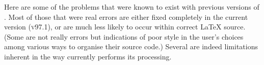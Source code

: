 \internal{}%
\startdocument
%
\tableofchildlinks*\htmlrule{}\html{\\}%
\noindent
Here are some of the problems that were known to exist
with previous versions of \latextohtml.
Most of those that were real errors are either fixed completely
in the current version (\textsc{v97.1}), or are much less likely to occur
within correct \LaTeX{} source. (Some are not really errors but
indications of poor style in the user's choices among
various ways to organise their source code.)\html{\\}
Several are indeed limitations inherent in the way
\latextohtml{} currently performs its processing.
%
